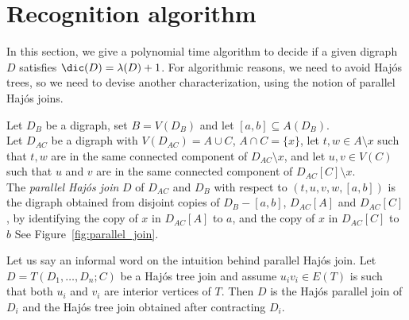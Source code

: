 \section{Recognition algorithm}\label{sec:algo}

In this section, we give a polynomial time algorithm to decide if a given digraph $D$ satisfies $\dic(D) = \lambda(D) + 1$. For algorithmic reasons, we need to avoid Haj\'os trees, so we need to devise another characterization, using the notion of parallel Haj\'os joins.






    
\begin{definition}\label{def:parallel_join}
    Let $D_B$ be a digraph, set $B=V(D_B)$ and let $[a,b] \subseteq A(D_{B})$. \\  
    Let $D_{AC}$ be a digraph with $V(D_{AC}) = A \cup C$, $A \cap C= \{x\}$, let $t,w \in A \setminus x$ such that $t,w$ are in the same connected component of $D_{AC} \setminus x$, and let $u,v \in V(C)$ such that $u$ and $v$ are in the same connected component of $D_{AC}[C] \setminus x$.\\ 
    The \emph{parallel Haj\'os join} $D$ of $D_{AC}$ and $D_B$ with respect to $(t,u,v,w, [a,b])$ is the digraph obtained from disjoint copies of $D_B-[a,b]$, $D_{AC}[A]$ and $D_{AC}[C]$, by identifying the copy of $x$ in $D_{AC}[A]$ to $a$, and the copy of $x$ in $D_{AC}[C]$ to $b$
    See Figure~\ref{fig:parallel_join}.
\end{definition}


Let us say an informal word on the intuition behind parallel Haj\'os join. 
Let $D=T(D_1, \dots, D_n;C)$ be a Haj\'os tree join and assume $u_iv_i \in E(T)$ is such that  both $u_i$ and $v_i$ are interior vertices of $T$. Then $D$ is the Haj\'os parallel join of $D_{i}$ and the Haj\'os tree join obtained after contracting $D_i$. 


